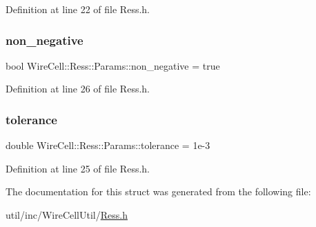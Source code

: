 Definition at line 22 of file Ress.\+h.

\mbox{\label{struct_wire_cell_1_1_ress_1_1_params_a7673375108a8c7a562274511cf56fd24}} 
\subsubsection{\texorpdfstring{non\+\_\+negative}{non\_negative}}
{\footnotesize\ttfamily bool Wire\+Cell\+::\+Ress\+::\+Params\+::non\+\_\+negative = true}



Definition at line 26 of file Ress.\+h.

\mbox{\label{struct_wire_cell_1_1_ress_1_1_params_a11b1fc66a53427fd673879f23bb2e768}} 
\subsubsection{\texorpdfstring{tolerance}{tolerance}}
{\footnotesize\ttfamily double Wire\+Cell\+::\+Ress\+::\+Params\+::tolerance = 1e-\/3}



Definition at line 25 of file Ress.\+h.



The documentation for this struct was generated from the following file\+:\begin{DoxyCompactItemize}
\item 
util/inc/\+Wire\+Cell\+Util/\hyperlink{_ress_8h}{Ress.\+h}\end{DoxyCompactItemize}

